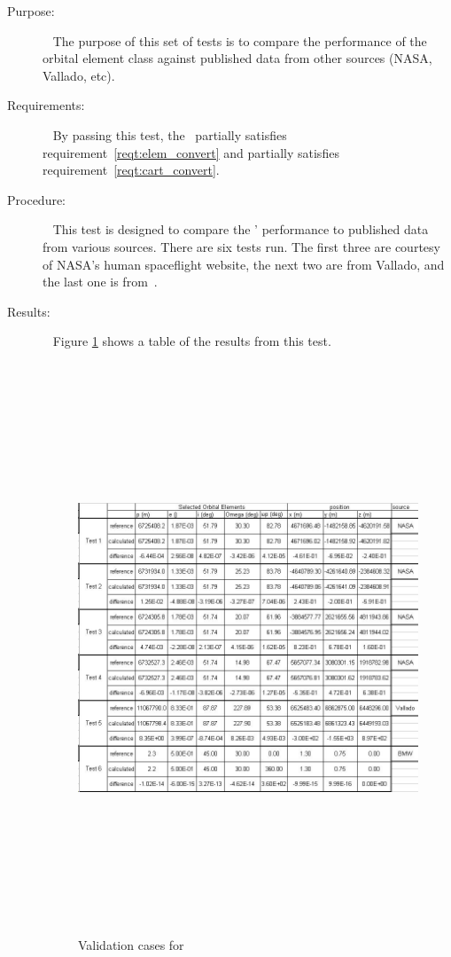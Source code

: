 \label{test:val_case}
\begin{description}
\item[Purpose:] \ \newline
The purpose of this set of tests is to compare the performance of the orbital
element class against published data from other sources (NASA, Vallado, etc).
\item[Requirements:] \ \newline
By passing this test, the \OrbitalElement\ partially satisfies
requirement~\ref{reqt:elem_convert} and partially satisfies
requirement~\ref{reqt:cart_convert}.
\item[Procedure:]\ \newline
This test is designed to compare the \OrbitalElement' performance to
published data from various sources.  There are six tests run.  The first
three are courtesy of NASA's human spaceflight website, the next two are from
Vallado, and the last one is from~\cite{BMW}.

\item[Results:]\ \newline
Figure \ref{val_cases} shows a table of the results from this test.
\begin{figure}[h]
\begin{center}
\includegraphics[height=170mm,width=170mm]{JPGfiles/val_case.jpg}
\caption{Validation cases for \OrbitalElement}
\label{val_cases}
\end{center}
\end{figure}


\end{description}
